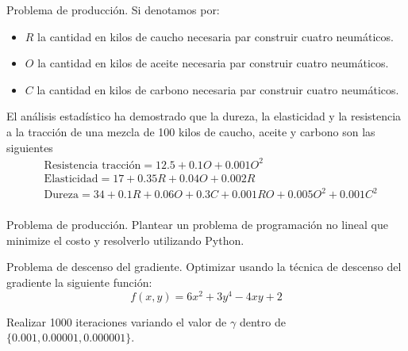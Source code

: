 \documentclass{beamer}
\begin{document}
\begin{frame}[fragile]{Problema de producción.}
  Si denotamos por: 
  \begin{itemize}
    \item $R$ la cantidad en kilos de caucho necesaria par construir cuatro neumáticos.
    \item $O$ la cantidad en kilos de aceite necesaria par construir cuatro neumáticos.
    \item $C$ la cantidad en kilos de carbono necesaria par construir cuatro neumáticos.
  \end{itemize}
  \pause 

 El análisis estadístico ha demostrado que la dureza, la elasticidad y la resistencia a la tracción de una mezcla de 100 kilos de caucho, aceite y carbono son las siguientes 
  \begin{align*}
    &\text{Resistencia tracción} =   12.5 + 0.1O + 0.001O^{2} \\ 
    &\text{Elasticidad} =  17 + 0.35R + 0.04O + 0.002R \\ 
    &\text{Dureza} =   34 + 0.1R + 0.06O + 0.3C + 0.001RO + 0.005O^{2}  + 0.001C^{2} \\ 
  \end{align*}
\end{frame}

\begin{frame}[fragile]{Problema de producción.}
  Plantear un problema de programación no lineal que minimize el costo y resolverlo utilizando Python.
\end{frame}

\begin{frame}[fragile]{Problema de descenso del gradiente.}
  Optimizar usando la técnica de descenso del gradiente la siguiente función: 
  \[
    f(x,y) = 6x^{2} + 3y^{4} - 4xy + 2
  \]
  
  Realizar 1000 iteraciones variando el valor de $\gamma$ dentro de $\{0.001,0.00001,0.000001\}$.
\end{frame}
\end{document}
